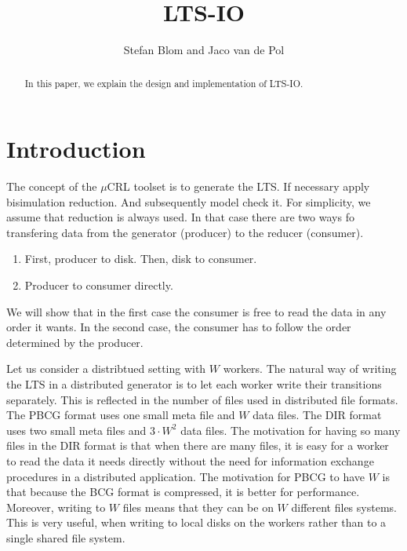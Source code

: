 \documentclass{article}
\title{LTS-IO}
\author{Stefan Blom and Jaco van de Pol}
\begin{document}
\maketitle

\begin{abstract}
In this paper, we explain the design and implementation of LTS-IO.
\end{abstract}

\section{Introduction}

The concept of the $\mu$CRL toolset is to generate the LTS.
If necessary apply bisimulation reduction. And subsequently
model check it. For simplicity, we assume that reduction is always used.
In that case there are two ways fo transfering data from the generator (producer)
to the reducer (consumer).
\begin{enumerate}
\item First, producer to disk. Then, disk to consumer.
\item Producer to consumer directly.
\end{enumerate}
We will show that in the first case the consumer is free to
read the data in any order it wants. In the second case, the consumer has to follow
the order determined by the producer.

\bigskip

Let us consider a distribtued setting with $W$ workers.
The natural way of writing the LTS in a distributed generator is to let each worker
write their transitions separately. This is reflected in the number of files used in
distributed file formats. The PBCG format uses one small meta file and $W$ data files.
The DIR format uses two small meta files and $3\cdot W^2$ data files.
The motivation for having so many files in the DIR format is that when there are many files,
it is easy for a worker to read the data it needs directly without the need for
information exchange procedures in a distributed application. The motivation for
PBCG to have $W$ is that because the BCG format is compressed, it is better for performance.
Moreover, writing to $W$ files means that they can be on $W$ different files systems.
This is very useful, when writing to local disks on the workers rather than to
a single shared file system.
\end{document}
